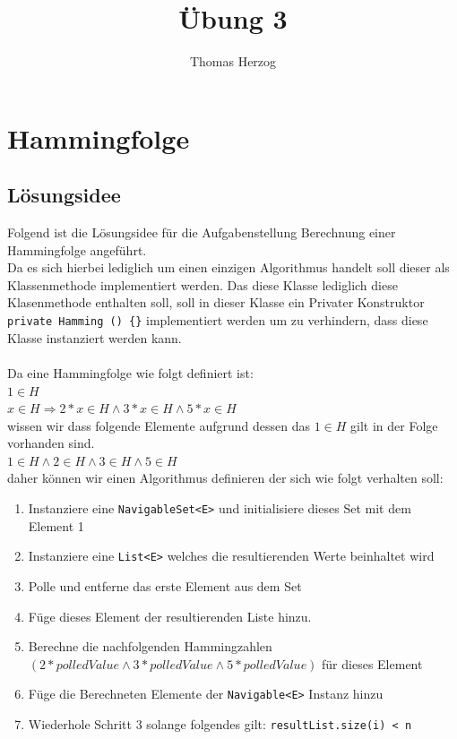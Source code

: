 \documentclass[11pt, a4paper, twoside]{article}   	%
\title{Übung 3}
\author{Thomas Herzog}
\newcommand{\ideaSection}{Lösungsidee}
\newcommand{\inlinecode}{\lstinline[style=inlineSource]}
\begin{document}
\setlength{\headheight}{15mm}

{\color{myred}
	\section
		{Hammingfolge}
}
\subsection{\ideaSection}
Folgend ist die Lösungsidee für die Aufgabenstellung Berechnung einer Hammingfolge angeführt.\\
Da es sich hierbei lediglich um einen einzigen Algorithmus handelt soll dieser als Klassenmethode implementiert werden. Das diese Klasse lediglich diese Klasenmethode enthalten soll, soll in dieser Klasse ein Privater Konstruktor \inlinecode|private Hamming () {}| implementiert werden um zu verhindern, dass diese Klasse instanziert werden kann.\\\\
Da eine Hammingfolge wie folgt definiert ist:\\
$1 \in H$ \\
$x \in H \Rightarrow 2 \ast x \in H \wedge 3 \ast x \in H \wedge 5 \ast x \in H$\\
wissen wir dass folgende Elemente aufgrund dessen das $1 \in H$ gilt in der Folge vorhanden sind. \\
$1 \in H \wedge 2 \in H \wedge 3 \in H \wedge 5 \in H$\\
daher können wir einen Algorithmus definieren der sich wie folgt verhalten soll:
\begin{enumerate}
	\item Instanziere eine \inlinecode{NavigableSet<E>} und initialisiere dieses Set mit dem Element 1
	\item Instanziere eine \inlinecode{List<E>} welches die resultierenden Werte beinhaltet wird
	\item Polle und entferne das erste Element aus dem Set
	\item Füge dieses Element der resultierenden Liste hinzu.		
	\item Berechne die nachfolgenden Hammingzahlen $(2 \ast polledValue \wedge 3 \ast polledValue \wedge 5 \ast polledValue)$ für dieses Element
	\item Füge die Berechneten Elemente der \inlinecode{Navigable<E>} Instanz hinzu
	\item Wiederhole Schritt 3 solange folgendes gilt:  \inlinecode{resultList.size(i) < n}
\end{enumerate}
\end{document}
